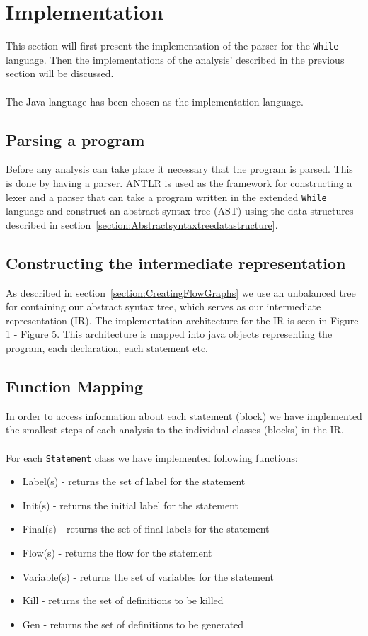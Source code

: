 \section{Implementation}
This section will first present the implementation of the parser for the \texttt{While} language. Then the implementations of the analysis' described in the previous section will be discussed.
\\\\
The Java language has been chosen as the implementation language.
 
\subsection{Parsing a program}
Before any analysis can take place it necessary that the program is parsed. This is done by having a parser. ANTLR is used as the framework for constructing a lexer and a parser that can take a program written in the extended \texttt{While} language and construct an abstract syntax tree (AST) using the data structures described in section~\ref{section:Abstractsyntaxtreedatastructure}. 

\subsection{Constructing the intermediate representation}
As described in section~\ref{section:CreatingFlowGraphs} we use an unbalanced tree for containing our abstract syntax tree, which serves as our intermediate representation (IR).
The implementation architecture for the IR is seen in Figure 1 - Figure 5. This architecture is mapped into java objects representing the program, each declaration, each statement etc.

\subsection{Function Mapping}
In order to access information about each statement (block) we have implemented the smallest steps of each analysis to the individual classes (blocks) in the IR.
\\\\
For each \texttt{Statement} class we have implemented following functions:
\begin{itemize}
\item Label(s) - returns the set of label for the statement 		
\item Init(s) - returns the initial label for the statement
\item Final(s) - returns the set of final labels for the statement 
\item Flow(s) - returns the flow for the statement
\item Variable(s) - returns the set of variables for the statement
\item Kill - returns the set of definitions to be killed	
\item Gen - returns the set of definitions to be generated
\end{itemize}

